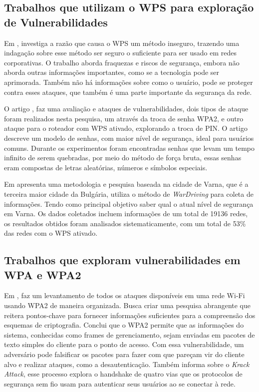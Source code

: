 \documentclass[
	article,			%
	11pt,				%
	oneside,			%
	a4paper,			%
	english,			%
	brazil,				%
	sumario=tradicional
	]{abntex2}
\begin{document}
\subsection{Trabalhos que utilizam o WPS para exploração de Vulnerabilidades}

Em , investiga a razão que causa o WPS um método inseguro, trazendo uma indagação sobre esse método ser seguro o suficiente para ser usado em redes corporativas. O trabalho aborda fraquezas e riscos de segurança, embora não aborda outras informações importantes, como se a tecnologia pode ser aprimorada. Também não há informações sobre como o usuário, pode se proteger contra esses ataques, que também é uma parte importante da segurança da rede.  

O artigo \cite{nikolov2018wireless}, faz uma avaliação e ataques de vulnerabilidades, dois tipos de ataque foram realizados nesta pesquisa, um através da troca de senha WPA2, e outro ataque para o roteador com WPS ativado, explorando a troca de PIN. O artigo descreve um modelo de senhas, com maior nível de segurança, ideal para usuários comuns. Durante os experimentos foram encontradas senhas que levam um tempo infinito de serem quebradas, por meio do método de força bruta, essas senhas eram compostas de letras aleatórias, números e símbolos especiais. 

Em \cite{valchanov2019study} apresenta uma metodologia e pesquisa baseada na cidade de Varna, que é a terceira maior cidade da Bulgária, utiliza o método de \textit{WarDriving} para coleta de informações. Tendo como principal objetivo saber qual o atual nível de segurança em Varna. Os dados coletados incluem informações de um total de 19136 redes, os resultados obtidos foram analisados sistematicamente, com um total de 53\% das redes com o WPS ativado.


\subsection{Trabalhos que exploram vulnerabilidades em WPA e WPA2 }
Em \cite{kohlios2018comprehensive}, faz um levantamento de todos os ataques disponíveis em uma rede Wi-Fi usando WPA2 de maneira organizada. Busca criar uma pesquisa abrangente que reitera pontos-chave para fornecer informações suficientes para a compreensão dos esquemas de criptografia. Conclui que o WPA2 permite que as informações do sistema, conhecidas como frames de gerenciamento, sejam enviadas em pacotes de texto simples do cliente para o ponto de acesso. Com essa vulnerabilidade, um adversário pode falsificar os pacotes para fazer com que pareçam vir do cliente alvo e realizar ataques, como a desautenticação. Também informa sobre o \textit{Krack Attack}, esse processo explora o handshake de quatro vias que os protocolos de segurança sem fio usam para autenticar seus usuários ao se conectar à rede. 
\end{document}
